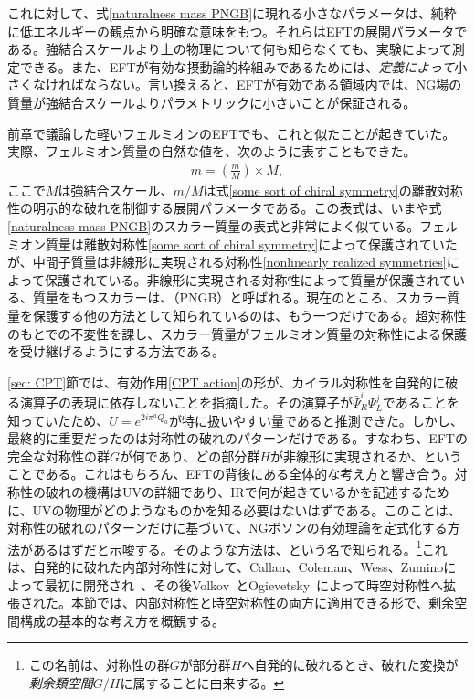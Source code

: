 これに対して、式\eqref{naturalness mass PNGB}に現れる小さなパラメータは、純粋に低エネルギーの観点から明確な意味をもつ。それらはEFTの展開パラメータである。強結合スケールより上の物理について何も知らなくても、実験によって測定できる。また、EFTが有効な摂動論的枠組みであるためには、\emph{定義によって}小さくなければならない。言い換えると、EFTが有効である領域内では、NG場の質量が強結合スケールよりパラメトリックに小さいことが保証される。

前章で議論した軽いフェルミオンのEFTでも、これと似たことが起きていた。実際、フェルミオン質量の自然な値を、次のように表すこともできた。
%
\begin{align} 
	m = \left( \frac{m}{M} \right) \times M ,
\end{align}
%
ここで$M$は強結合スケール、$m/M$は式\eqref{some sort of chiral symmetry}の離散対称性の明示的な破れを制御する展開パラメータである。この表式は、いまや式\eqref{naturalness mass PNGB}のスカラー質量の表式と非常によく似ている。フェルミオン質量は離散対称性\eqref{some sort of chiral symmetry}によって保護されていたが、中間子質量は非線形に実現される対称性\eqref{nonlinearly realized symmetries}によって保護されている。非線形に実現される対称性によって質量が保護されている、質量をもつスカラーは、（PNGB）と呼ばれる。現在のところ、スカラー質量を保護する他の方法として知られているのは、もう一つだけである。超対称性のもとでの不変性を課し、スカラー質量がフェルミオン質量の対称性による保護を受け継げるようにする方法である。






\ref{sec: CPT}節では、有効作用\eqref{CPT action}の形が、カイラル対称性を自発的に破る演算子の表現に依存しないことを指摘した。その演算子が$\bar \Psi^i_R \Psi_L^j$であることを知っていたため、$U=e^{2 i \pi^a Q_a}$が特に扱いやすい量であると推測できた。しかし、最終的に重要だったのは対称性の破れのパターンだけである。すなわち、EFTの完全な対称性の群$G$が何であり、どの部分群$H$が非線形に実現されるか、ということである。これはもちろん、EFTの背後にある全体的な考え方と響き合う。対称性の破れの機構はUVの詳細であり、IRで何が起きているかを記述するために、UVの物理がどのようなものかを知る必要はないはずである。このことは、対称性の破れのパターンだけに基づいて、NGボソンの有効理論を定式化する方法があるはずだと示唆する。そのような方法は、という名で知られる。\footnote{この名前は、対称性の群$G$が部分群$H$へ自発的に破れるとき、破れた変換が{\it 剰余類空間}$G/H$に属することに由来する。}これは、自発的に破れた内部対称性に対して、Callan、Coleman、Wess、Zuminoによって最初に開発され~\cite{Callan:1969sn}、その後Volkov~\cite{Volkov:1973vd}とOgievetsky~\cite{ogievetsky:1974ab}によって時空対称性へ拡張された。本節では、内部対称性と時空対称性の両方に適用できる形で、剰余空間構成の基本的な考え方を概観する。


